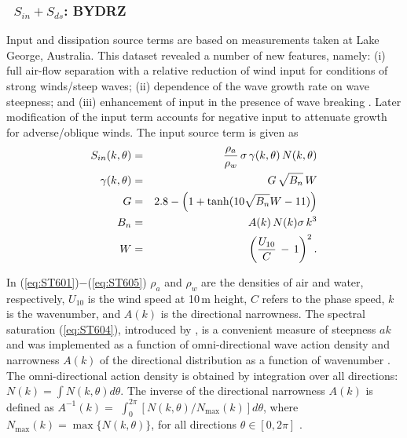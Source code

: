 \vsssub
\subsubsection{~$S_{in} + S_{ds}$: BYDRZ} \label{sec:ST6}
\vsssub


\noindent
Input and dissipation source terms are based on measurements 
taken at Lake George, Australia. This dataset revealed a number 
of new features, namely: (i) full air-flow separation with a relative 
reduction of wind input for conditions of strong winds/steep waves; 
(ii) dependence of the wave growth rate on wave steepness; and 
(iii) enhancement of input in the presence of wave breaking
\citep{art:DBYB06,art:BBYD07}. Later modification of the input term accounts
for negative input to attenuate growth for adverse/oblique winds. 
 The input source term is given as
\begin{eqnarray}
S_{in}(k,\theta) & = & \frac{\rho_a}{\rho_w}\, \sigma\,\gamma(k,\theta)\,N(k,\theta)
\label{eq:ST601} \\
\gamma(k,\theta) &=& G\,\sqrt{B_n}\,W
\label{eq:ST602} \\
G                &=& 2.8-\Bigl (1+\tanh (10\sqrt{B_n}W-11) \Bigr)
\label{eq:ST603} \\
B_n              &=& A(k)\,N(k)\sigma\,k^3
\label{eq:ST604} \\
W                &=& \left (\frac{U_{10}}{C}\,-\,1 \right )^2.
\label{eq:ST605}
\end{eqnarray}

In (\ref{eq:ST601})$-$(\ref{eq:ST605}) $\rho_a$ and $\rho_w$ are the densities
of air and water, respectively, $U_{10}$ is the wind speed at 10\,m height, 
$C$ refers to the phase speed, $k$ is the wavenumber, and $A(k)$ 
is the directional narrowness. The spectral saturation (\ref{eq:ST604}), 
introduced by \citet{art:Phi84}, is a convenient measure 
of steepness $ak$ and was implemented as a function of 
omni-directional wave action density and narrowness $A(k)$ 
of the directional distribution as a function of wavenumber \citep{art:BGM02}.
The omni-directional action density is obtained by integration
over all directions: $N(k)=\int N(k,\theta)d\theta$.             \linebreak
The inverse of the directional narrowness $A(k)$ is defined as   \linebreak
$A^{-1}(k) =$ $\int_{0}^{2\pi} [{N(k,\theta)}/{N_{\max}(k)}] d\theta$,
where  $N_{\max}(k)=\max\bigl \{N(k,\theta)\bigr \}$,
for all directions $\theta\in[0,2\pi]$ \citep{art:BS87}. 


